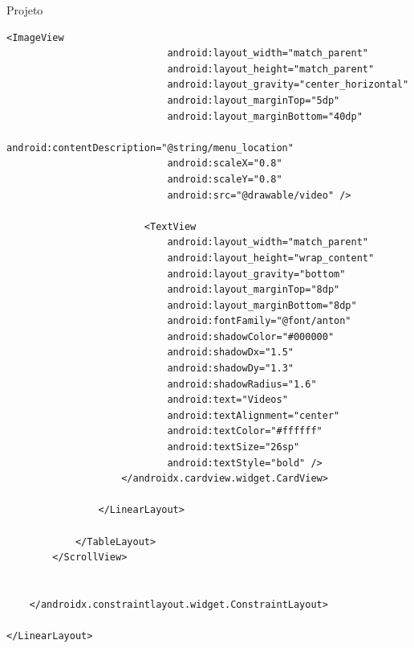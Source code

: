 \documentclass[
	12pt,				%
	openright,			%
	twoside,			%
	a4paper,			%
	english,			%
	french,				%
	spanish,			%
	brazil				%
	]{abntex2}
\begin{document}
\begin{chapter}{Projeto}
\begin{lstlisting}[numbers=none,
basicstyle=\small,
caption={Fragment Main.xml},
title={Fragment Main.xml},
xleftmargin=4pt,
label={fragment_main.xml}]
                        <ImageView
                            android:layout_width="match_parent"
                            android:layout_height="match_parent"
                            android:layout_gravity="center_horizontal"
                            android:layout_marginTop="5dp"
                            android:layout_marginBottom="40dp"
                            android:contentDescription="@string/menu_location"
                            android:scaleX="0.8"
                            android:scaleY="0.8"
                            android:src="@drawable/video" />

                        <TextView
                            android:layout_width="match_parent"
                            android:layout_height="wrap_content"
                            android:layout_gravity="bottom"
                            android:layout_marginTop="8dp"
                            android:layout_marginBottom="8dp"
                            android:fontFamily="@font/anton"
                            android:shadowColor="#000000"
                            android:shadowDx="1.5"
                            android:shadowDy="1.3"
                            android:shadowRadius="1.6"
                            android:text="Videos"
                            android:textAlignment="center"
                            android:textColor="#ffffff"
                            android:textSize="26sp"
                            android:textStyle="bold" />
                    </androidx.cardview.widget.CardView>

                </LinearLayout>

            </TableLayout>
        </ScrollView>


    </androidx.constraintlayout.widget.ConstraintLayout>

</LinearLayout>
\end{lstlisting}


\newpage

\end{chapter}
\end{document}
